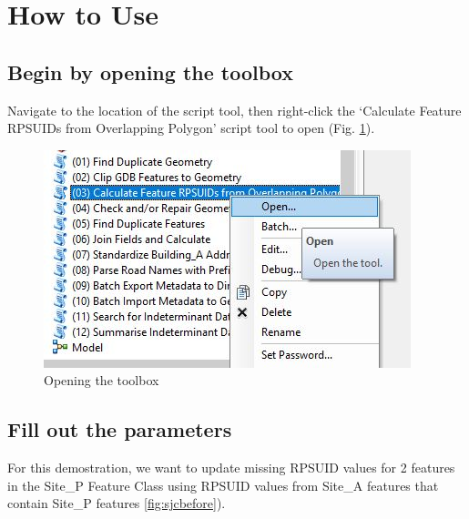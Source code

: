 \documentclass[openany]{book}
\theoremstyle{definition}
\theoremstyle{definition}
\theoremstyle{definition}
\theoremstyle{remark}
\begin{document}
\section{How to Use}\label{how-to-use-1}

\subsection{Begin by opening the
toolbox}\label{begin-by-opening-the-toolbox-1}

Navigate to the location of the script tool, then right-click the
`Calculate Feature RPSUIDs from Overlapping Polygon' script tool to open
(Fig. \ref{fig:sjcopentool}).

\begin{figure}[H]

\hfill{}\includegraphics{figures/spatjoinCalcopentool} 

\caption{Opening the toolbox}\label{fig:sjcopentool}
\end{figure}

\subsection{Fill out the parameters}\label{fill-out-the-parameters-1}

For this demostration, we want to update missing RPSUID values for 2
features in the Site\_P Feature Class using RPSUID values from Site\_A
features that contain Site\_P features \ref{fig:sjcbefore}).
\end{document}
